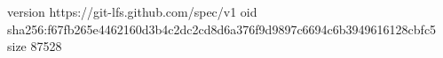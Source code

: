 version https://git-lfs.github.com/spec/v1
oid sha256:f67fb265e4462160d3b4c2dc2cd8d6a376f9d9897c6694c6b3949616128cbfc5
size 87528
